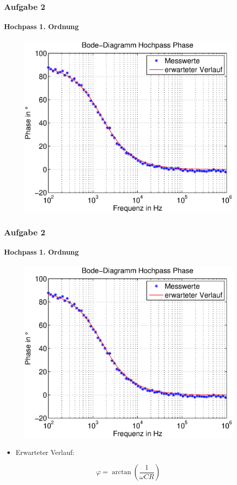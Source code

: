 \begin{frame}
    \frametitle{Aufgabe 2}
    \framesubtitle{Hochpass 1. Ordnung}
     \begin{figure}[H]
     \begin{center}
             \includegraphics[scale=0.60]{./img/2b_bode_hoch_phase.eps}
     \end{center}
     \end{figure}
\end{frame}
\begin{frame}
    \frametitle{Aufgabe 2}
    \framesubtitle{Hochpass 1. Ordnung}
     \begin{figure}[H]
     \begin{center}
             \includegraphics[scale=0.45]{./img/2b_bode_hoch_phase.eps}
     \end{center}
     \end{figure}
     \begin{itemize}
         \item Erwarteter Verlauf: 
     \end{itemize}
     \begin{equation*}
            \varphi = \arctan \left( \frac{1}{\omega C R} \right)
     \end{equation*}
\end{frame}
